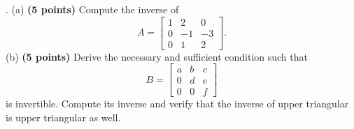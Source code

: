 \documentclass[12pt,a4paper]{article}
\newcommand{\gray}[1]{\textcolor{gray}{}}
\renewcommand{\l}{\left}
\renewcommand{\r}{\right}
\begin{document}
\newpage
{}. 
(a) \textbf{(5 points)} Compute the inverse of 
\begin{equation*}
	A = \l[
	\begin{array}{ccc}
		1 & 2 & 0 \\
		0 & -1 & -3 \\
		0 & 1 & 2
	\end{array}
	\r].
\end{equation*}
(b) \textbf{(5 points)} Derive the necessary and sufficient condition such that  
\begin{equation*}
	B = \l[
	\begin{array}{ccc}
		a & b & c\\
		0 & d & e \\
		0 & 0 & f
	\end{array}
	\r]
\end{equation*}
is invertible. Compute its inverse and verify that the inverse of upper triangular is upper triangular as well. \\
\\
\gray{
	(a)
	\begin{equation*}
	A^{-1} = \l[
	\begin{array}{ccc}
		1 & -4 & -6 \\
		0 & 2 & 3 \\
		0 & -1 & -1
	\end{array}
	\r]
	\end{equation*}
	(b) The condition is $adg \neq 0$ and the inverse is
	\begin{equation*}
	B^{-1} = \l[
	\begin{array}{ccc}
	    \frac1a & \frac{-b}{ad} & \frac{-c}{af} \\
	    0 & \frac1d & \frac{-e}{df} \\
		0 & 0 & \frac1f
	\end{array}
	\r]
	\end{equation*}
}
\end{document}
